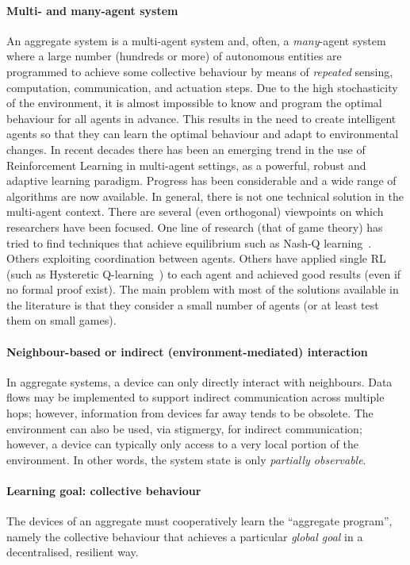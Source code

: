 \documentclass[conference]{IEEEtran}
\newcommand{\suggestions}[1]{\todo[inline, color=yellow]{#1}}
\begin{document}
\paragraph{Multi- and many-agent system}
%
An aggregate system is a multi-agent system
 and, often, a \emph{many}-agent system
 where a large number (hundreds or more)
 of autonomous entities are programmed to achieve 
 some collective behaviour by means of \emph{repeated} 
 sensing, computation, communication, and actuation steps.
%
Due to the high stochasticity of the environment,
 it is almost impossible to know and
 program the optimal behaviour for all agents in advance.
 This results in the need to create intelligent agents
 so that they can learn the optimal behaviour and adapt to environmental changes.
%
In recent decades there has been an emerging trend in the use of Reinforcement Learning
 in multi-agent settings, as a powerful, robust and adaptive learning paradigm.
 Progress has been considerable and a wide range of algorithms are now available.
In general, there is not one technical solution in the multi-agent context.
 There are several (even orthogonal) viewpoints on which researchers have been focused.
 One line of research (that of game theory) has tried to find techniques that achieve equilibrium such as Nash-Q learning~\cite{nash-q}.
 Others exploiting coordination between agents. 
 Others have applied single RL (such as Hysteretic Q-learning~\cite{hysteretic-q}) to each agent and achieved good results (even if no formal proof exist).
%
 The main problem with most of the solutions available in the literature is that they consider a small number of agents (or at least test them on small games).

\paragraph{Neighbour-based or indirect (environment-mediated) interaction}
%
In aggregate systems, a device can only directly interact with neighbours.
%
Data flows may be implemented
 to support indirect communication across multiple hops;
 however, information from devices far away tends to be obsolete.
%
The environment can also be used, via stigmergy,
 for indirect communication;
 however, a device can typically only access 
  to a very local portion of the environment.
%
In other words, the system state is only \emph{partially observable}.
%
\suggestions{What kind of ML algorithms can be used here?}
\paragraph{Learning goal: collective behaviour}
%
The devices of an aggregate 
 must cooperatively learn the ``aggregate program'',
 namely the collective behaviour 
 that achieves a particular \emph{global goal}
 in a decentralised, resilient way.
%
\end{document}
